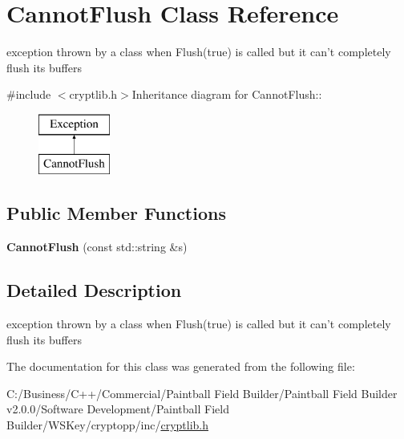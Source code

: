 \hypertarget{class_cannot_flush}{
\section{CannotFlush Class Reference}
\label{class_cannot_flush}
}


exception thrown by a class when Flush(true) is called but it can't completely flush its buffers  


{\ttfamily \#include $<$cryptlib.h$>$}Inheritance diagram for CannotFlush::\begin{figure}[H]
\begin{center}
\leavevmode
\includegraphics[height=2cm]{class_cannot_flush}
\end{center}
\end{figure}
\subsection*{Public Member Functions}
\begin{DoxyCompactItemize}
\item 
\hypertarget{class_cannot_flush_a227170bcacb0d250c6ded893b22d4e5c}{
{\bfseries CannotFlush} (const std::string \&s)}
\label{class_cannot_flush_a227170bcacb0d250c6ded893b22d4e5c}

\end{DoxyCompactItemize}


\subsection{Detailed Description}
exception thrown by a class when Flush(true) is called but it can't completely flush its buffers 

The documentation for this class was generated from the following file:\begin{DoxyCompactItemize}
\item 
C:/Business/C++/Commercial/Paintball Field Builder/Paintball Field Builder v2.0.0/Software Development/Paintball Field Builder/WSKey/cryptopp/inc/\hyperlink{cryptlib_8h}{cryptlib.h}\end{DoxyCompactItemize}

